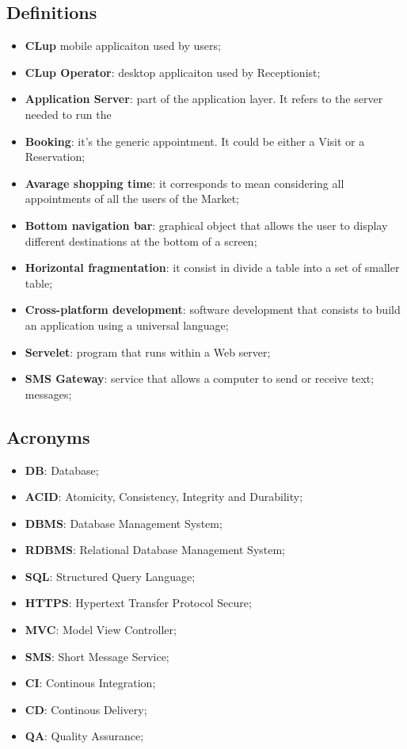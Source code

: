 \subsection{Definitions}
\begin{itemize}
\item \textbf{CLup} mobile applicaiton used by users;
\item \textbf{CLup Operator}: desktop applicaiton used by Receptionist;
\item \textbf{Application Server}: part of the application layer. It refers to the server needed to run the 
\item \textbf{Booking}: it's the generic appointment. It could be either a Visit or a Reservation;
\item \textbf{Avarage shopping time}: it corresponds to mean considering all appointments of all the users of the Market; 
\item \textbf{Bottom navigation bar}: graphical object that allows the user to display different destinations at the bottom of a screen;
\item \textbf{Horizontal fragmentation}: it consist in divide a table into a set of smaller table;
\item \textbf{Cross-platform development}: software development that consists to build an application using a universal language;
\item \textbf{Servelet}: program that runs within a Web server;
\item \textbf{SMS Gateway}: service that allows a computer to send or receive text; messages; 
\end{itemize}
\subsection{Acronyms}
\begin{itemize}
\item \textbf{DB}: Database;
\item \textbf{ACID}: Atomicity, Consistency, Integrity and Durability;
\item \textbf{DBMS}: Database Management System;
\item \textbf{RDBMS}: Relational Database Management System;
\item \textbf{SQL}: Structured Query Language;
\item \textbf{HTTPS}: Hypertext Transfer Protocol Secure;
\item \textbf{MVC}: Model View Controller;
\item \textbf{SMS}: Short Message Service;
\item \textbf{CI}: Continous Integration;
\item \textbf{CD}: Continous Delivery;
\item \textbf{QA}: Quality Assurance;
\end{itemize}


